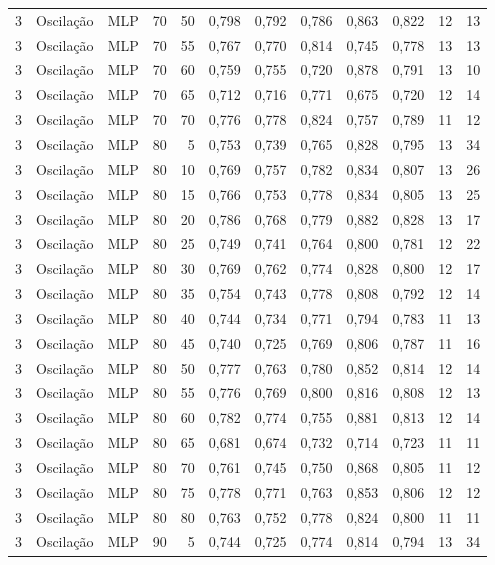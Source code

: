 \begin{longtable}{ccclrrrrrrrr}
3 & Oscilação & MLP & 70 & 50 & 0,798 & 0,792 & 0,786 & 0,863 & 0,822 & 12 & 13 \\
3 & Oscilação & MLP & 70 & 55 & 0,767 & 0,770 & 0,814 & 0,745 & 0,778 & 13 & 13 \\
3 & Oscilação & MLP & 70 & 60 & 0,759 & 0,755 & 0,720 & 0,878 & 0,791 & 13 & 10 \\
3 & Oscilação & MLP & 70 & 65 & 0,712 & 0,716 & 0,771 & 0,675 & 0,720 & 12 & 14 \\
3 & Oscilação & MLP & 70 & 70 & 0,776 & 0,778 & 0,824 & 0,757 & 0,789 & 11 & 12 \\
3 & Oscilação & MLP & 80 & 5 & 0,753 & 0,739 & 0,765 & 0,828 & 0,795 & 13 & 34 \\
3 & Oscilação & MLP & 80 & 10 & 0,769 & 0,757 & 0,782 & 0,834 & 0,807 & 13 & 26 \\
3 & Oscilação & MLP & 80 & 15 & 0,766 & 0,753 & 0,778 & 0,834 & 0,805 & 13 & 25 \\
3 & Oscilação & MLP & 80 & 20 & 0,786 & 0,768 & 0,779 & 0,882 & 0,828 & 13 & 17 \\
3 & Oscilação & MLP & 80 & 25 & 0,749 & 0,741 & 0,764 & 0,800 & 0,781 & 12 & 22 \\
3 & Oscilação & MLP & 80 & 30 & 0,769 & 0,762 & 0,774 & 0,828 & 0,800 & 12 & 17 \\
3 & Oscilação & MLP & 80 & 35 & 0,754 & 0,743 & 0,778 & 0,808 & 0,792 & 12 & 14 \\
3 & Oscilação & MLP & 80 & 40 & 0,744 & 0,734 & 0,771 & 0,794 & 0,783 & 11 & 13 \\
3 & Oscilação & MLP & 80 & 45 & 0,740 & 0,725 & 0,769 & 0,806 & 0,787 & 11 & 16 \\
3 & Oscilação & MLP & 80 & 50 & 0,777 & 0,763 & 0,780 & 0,852 & 0,814 & 12 & 14 \\
3 & Oscilação & MLP & 80 & 55 & 0,776 & 0,769 & 0,800 & 0,816 & 0,808 & 12 & 13 \\
3 & Oscilação & MLP & 80 & 60 & 0,782 & 0,774 & 0,755 & 0,881 & 0,813 & 12 & 14 \\
3 & Oscilação & MLP & 80 & 65 & 0,681 & 0,674 & 0,732 & 0,714 & 0,723 & 11 & 11 \\
3 & Oscilação & MLP & 80 & 70 & 0,761 & 0,745 & 0,750 & 0,868 & 0,805 & 11 & 12 \\
3 & Oscilação & MLP & 80 & 75 & 0,778 & 0,771 & 0,763 & 0,853 & 0,806 & 12 & 12 \\
3 & Oscilação & MLP & 80 & 80 & 0,763 & 0,752 & 0,778 & 0,824 & 0,800 & 11 & 11 \\
3 & Oscilação & MLP & 90 & 5 & 0,744 & 0,725 & 0,774 & 0,814 & 0,794 & 13 & 34 \\

\end{longtable}
